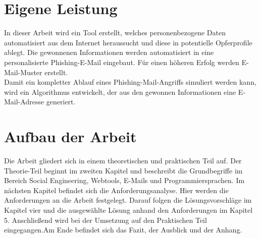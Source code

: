 

 	
\section{Eigene Leistung}
\label {sec:Eigene Leistung} 
In dieser Arbeit wird ein Tool erstellt, welches personenbezogene Daten automatisiert aus dem Internet heraussucht und diese in potentielle Opferprofile ablegt. Die gewonnenen Informationen werden  automatisiert in eine personalisierte Phishing-E-Mail eingebaut. Für einen höheren Erfolg werden E-Mail-Muster erstellt.\\
Damit ein kompletter Ablauf eines Phishing-Mail-Angriffs simuliert werden kann, wird ein Algorithmus entwickelt, der aus den gewonnen Informationen eine E-Mail-Adresse generiert.

\section{Aufbau der Arbeit}
\label {sec:Aufbau der Arbeit} 
Die Arbeit gliedert sich in einem theoretischen und praktischen Teil auf. Der Theorie-Teil beginnt im zweiten Kapitel und beschreibt die Grundbegriffe im Bereich Social Engineering, Webtools, E-Mails und Programmiersprachen. Im nächsten Kapitel befindet sich die Anforderungsanalyse. Hier werden die Anforderungen an die Arbeit festgelegt. Darauf folgen die Lösungsvorschläge im Kapitel vier und die ausgewählte Lösung anhand den Anforderungen im Kapitel 5. Anschließend wird bei der Umsetzung auf den Praktischen Teil eingegangen.Am Ende befindet sich das Fazit, der Ausblick und der Anhang.






